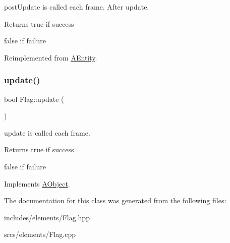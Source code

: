 post\+Update is called each frame. After update. 

\begin{DoxyReturn}{Returns}
true if success 

false if failure 
\end{DoxyReturn}


Reimplemented from \hyperlink{class_a_entity_ae2faa1d11e21033a223fef2bc03b9338}{A\+Entity}.

\mbox{\label{class_flag_adeaab6cd88bbc3284f8b4f1b2f78242b}} 
\subsubsection{\texorpdfstring{update()}{update()}}
{\footnotesize\ttfamily bool Flag\+::update (\begin{DoxyParamCaption}{ }\end{DoxyParamCaption})\hspace{0.3cm}{\ttfamily [virtual]}}



update is called each frame. 

\begin{DoxyReturn}{Returns}
true if success 

false if failure 
\end{DoxyReturn}


Implements \hyperlink{class_a_object_af35bb4b68af0a11bb1fcf617bde41ecd}{A\+Object}.



The documentation for this class was generated from the following files\+:\begin{DoxyCompactItemize}
\item 
includes/elements/Flag.\+hpp\item 
srcs/elements/Flag.\+cpp\end{DoxyCompactItemize}
